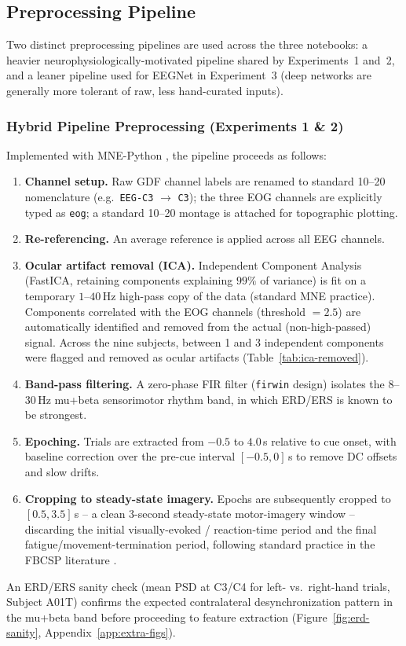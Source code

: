 \documentclass[11pt,a4paper]{article}
\begin{document}
\subsection{Preprocessing Pipeline}
\label{sec:preproc}

Two distinct preprocessing pipelines are used across the three notebooks: a heavier
neurophysiologically-motivated pipeline shared by Experiments~1 and~2, and a leaner pipeline used for
EEGNet in Experiment~3 (deep networks are generally more tolerant of raw, less hand-curated inputs).

\subsubsection{Hybrid Pipeline Preprocessing (Experiments 1 \& 2)}
Implemented with MNE-Python \cite{gramfort2013mne}, the pipeline proceeds as follows:
\begin{enumerate}[leftmargin=1.2cm]
    \item \textbf{Channel setup.} Raw GDF channel labels are renamed to standard 10--20 nomenclature
    (e.g.\ \texttt{EEG-C3} $\rightarrow$ \texttt{C3}); the three EOG channels are explicitly typed as
    \texttt{eog}; a standard 10--20 montage is attached for topographic plotting.
    \item \textbf{Re-referencing.} An average reference is applied across all EEG channels.
    \item \textbf{Ocular artifact removal (ICA).} Independent Component Analysis (FastICA,
    retaining components explaining $99\%$ of variance) is fit on a temporary $1$--$40$\,Hz
    high-pass copy of the data (standard MNE practice). Components correlated with the EOG channels
    (threshold $=2.5$) are automatically identified and removed from the actual (non-high-passed)
    signal. Across the nine subjects, between 1 and 3 independent components were flagged and
    removed as ocular artifacts (Table~\ref{tab:ica-removed}).
    \item \textbf{Band-pass filtering.} A zero-phase FIR filter (\texttt{firwin} design) isolates
    the $8$--$30$\,Hz mu+beta sensorimotor rhythm band, in which ERD/ERS is known to be strongest.
    \item \textbf{Epoching.} Trials are extracted from $-0.5$ to $4.0$\,s relative to cue onset,
    with baseline correction over the pre-cue interval $[-0.5, 0]$\,s to remove DC offsets and slow
    drifts.
    \item \textbf{Cropping to steady-state imagery.} Epochs are subsequently cropped to
    $[0.5, 3.5]$\,s -- a clean $3$-second steady-state motor-imagery window -- discarding the initial
    visually-evoked / reaction-time period and the final fatigue/movement-termination period, following
    standard practice in the FBCSP literature \cite{ang2008fbcsp}.
\end{enumerate}
An ERD/ERS sanity check (mean PSD at C3/C4 for left- vs.\ right-hand trials, Subject A01T) confirms
the expected contralateral desynchronization pattern in the mu+beta band before proceeding to feature
extraction (Figure~\ref{fig:erd-sanity}, Appendix~\ref{app:extra-figs}).
\end{document}
